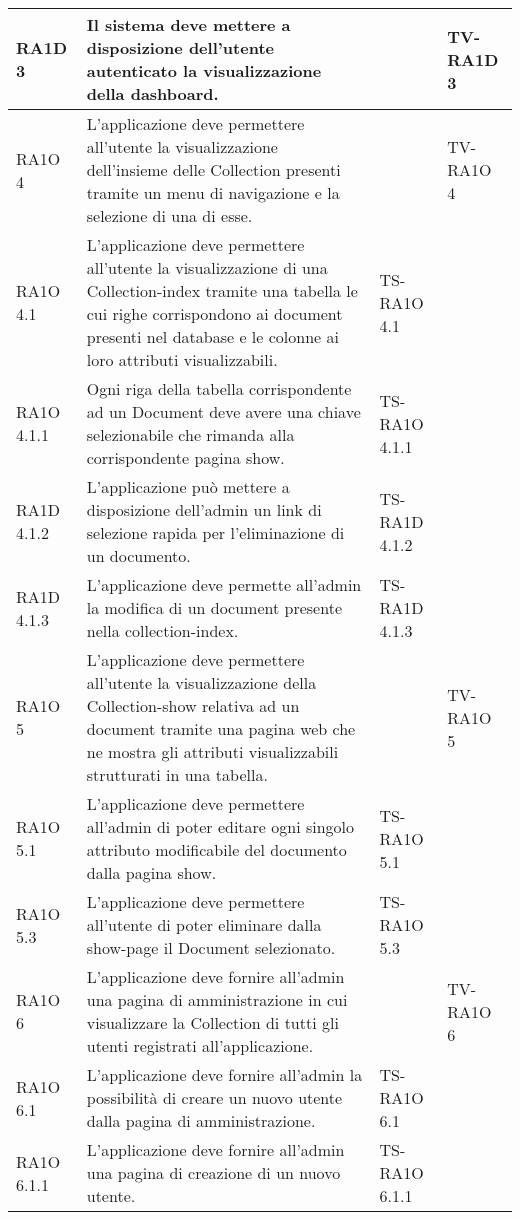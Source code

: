 \begin{center}
\begin{longtable}{| p{2cm} | p{6cm} | p{2.5cm} | p{2.5cm} | }
					RA1D 3 & 
					Il sistema deve mettere a disposizione dell'utente autenticato la visualizzazione della dashboard. &  & TV-RA1D 3 \\ \hline 
					RA1O 4 & 
					L'applicazione deve permettere all'utente la visualizzazione dell'insieme delle Collection presenti tramite un menu di navigazione e la selezione di una di esse. &  & TV-RA1O 4 \\ \hline 
					RA1O 4.1 & 
					L'applicazione deve permettere all'utente la visualizzazione di una Collection-index tramite una tabella le cui righe corrispondono ai document presenti nel database e le colonne ai loro attributi visualizzabili. & TS-RA1O 4.1 & \\ \hline 
					RA1O 4.1.1 & 
					Ogni riga della tabella corrispondente ad un Document deve avere una chiave selezionabile che rimanda alla corrispondente pagina show. & TS-RA1O 4.1.1 & \\ \hline 
					RA1D 4.1.2 & 
					L’applicazione può mettere a disposizione dell’admin un link di selezione rapida per l’eliminazione di un documento. & TS-RA1D 4.1.2 & \\ \hline 
					RA1D 4.1.3 & 
					L’applicazione deve permette all’admin la modifica di un document presente nella collection-index. & TS-RA1D 4.1.3 & \\ \hline 
					RA1O 5 & 
					L'applicazione deve permettere all'utente la visualizzazione della Collection-show relativa ad un document tramite una pagina web che ne mostra gli attributi visualizzabili strutturati in una tabella. &  & TV-RA1O 5 \\ \hline 
					RA1O 5.1 & 
					L'applicazione deve permettere all'admin di poter editare ogni singolo attributo modificabile del documento dalla pagina show. & TS-RA1O 5.1 & \\ \hline 
					RA1O 5.3 & 
					L'applicazione deve permettere all'utente di poter eliminare dalla show-page il Document selezionato.
 & TS-RA1O 5.3 & \\ \hline 
					RA1O 6 & 
					L'applicazione deve fornire all'admin una pagina di amministrazione in cui visualizzare la Collection di tutti gli utenti registrati all'applicazione. &  & TV-RA1O 6 \\ \hline 
					RA1O 6.1 & 
					L'applicazione deve fornire all'admin la possibilità  di creare un nuovo utente dalla pagina di amministrazione. & TS-RA1O 6.1 & \\ \hline 
					RA1O 6.1.1 & 
					L'applicazione deve fornire all'admin una pagina di creazione di un nuovo utente. & TS-RA1O 6.1.1 & \\ \hline 

\end{longtable}
\end{center}
